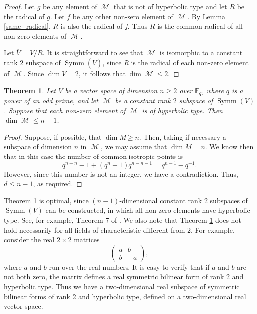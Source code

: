 \documentclass{amsart}
\DeclareMathOperator{\M}{\mathcal{M}}
\DeclareMathOperator{\Symm}{Symm}
\theoremstyle{plain}
\newtheorem{theorem}{Theorem}
\theoremstyle{definition}
\begin{document}
\begin{proof}
 
Let $g$ be any element of $\M$ that is not of hyperbolic type and let $R$ be the radical of $g$. Let $f$ be any other non-zero element of
$\M$. By Lemma \ref{same_radical}, $R$ is also the radical of $f$. Thus $R$ is the common radical of all non-zero elements
of $\M$.

Let $\overline{V}=V/R$. It is straightforward to see that $\M$ is isomorphic to a constant rank 2 subspace of $\Symm(\overline{V})$, since
$R$ is the radical of each non-zero element of $\M$. Since $\dim \overline{V}=2$, it follows that $\dim \M\leq 2$.
\end{proof}

\begin{theorem} \label{dimension_at_most_n-1}
 Let $V$ be a  vector space of dimension $n\geq 2$ over $\mathbb{F}_{q}$, where $q$ is a power of an odd prime, 
and 
let $\M$ be a constant rank $2$ subspace of $\Symm(V)$. Suppose that each non-zero element
of $\M$ is of hyperbolic type. Then $\dim \M\le n-1$. 

\end{theorem}

\begin{proof}
Suppose, if possible, that $\dim M\geq n$. Then, taking if necessary a subspace of dimension $n$ in $\M$, we may assume that $\dim M=n$.
We know then that in this case the number of common isotropic points is
\[
 q^{n-n}-1+(q^n-1)q^{n-n-1}=q^{n-1}-q^{-1}.
\]
However, since this number is not an integer, we have a contradiction. Thus, $d\leq n-1$, as required.

\end{proof}

Theorem \ref{dimension_at_most_n-1} is optimal, since $(n-1)$-dimensional constant rank 2
subspaces of $\Symm(V)$ can be constructed, in which all non-zero elements have hyperbolic type. See, for example, Theorem 7 of \cite{DGS}. We also note that Theorem \ref{dimension_at_most_n-1} does not hold
necessarily for all fields of characteristic different from $2$. For example, consider the real $2\times 2$ matrices
\[
\left(
\begin{array}
{rr}
        a&b\\
        b&-a    
\end{array}
\right),
\]
where $a$ and $b$ run over the real numbers. It is easy to verify that if $a$ and $b$ are not both zero, the matrix defines a real symmetric bilinear
form of rank 2 and hyperbolic type. Thus we have a two-dimensional real subspace of symmetric bilinear forms of rank 2 and hyperbolic type, defined
on a two-dimensional real vector space.
\end{document}
